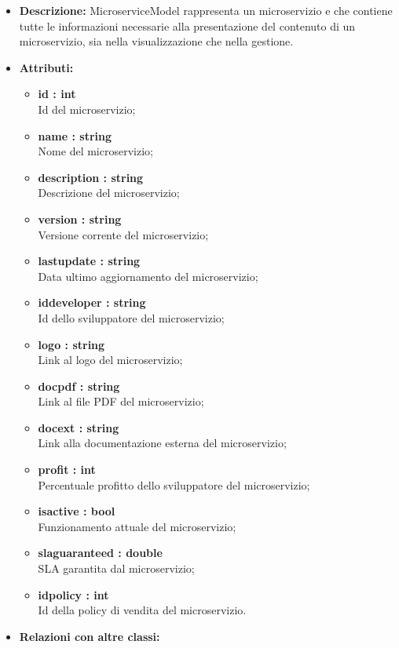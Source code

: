\begin{itemize}
	\item \textbf{Descrizione:} MicroserviceModel rappresenta un microservizio e che contiene tutte le
informazioni necessarie alla presentazione del contenuto di un microservizio, sia nella visualizzazione che nella gestione.
	\item \textbf{Attributi:}
		\begin{itemize}
			\item \textbf{id : int}\\
			Id del microservizio;
			\item \textbf{name : string}\\
			Nome del microservizio;
			\item \textbf{description : string}\\
			Descrizione del microservizio;
			\item \textbf{version : string}\\
			Versione corrente del microservizio;
			\item \textbf{lastupdate : string}\\
			Data ultimo aggiornamento del microservizio;
			\item \textbf{iddeveloper : string}\\
			Id dello sviluppatore del microservizio;
			\item \textbf{logo : string}\\
			Link al logo del microservizio;
			\item \textbf{docpdf : string}\\
			Link al file PDF del microservizio;
			\item \textbf{docext : string}\\
			Link alla documentazione esterna del microservizio;
			\item \textbf{profit : int}\\
			Percentuale profitto dello sviluppatore del microservizio;
			\item \textbf{isactive : bool}\\
			Funzionamento attuale del microservizio;
			\item \textbf{slaguaranteed : double}\\
			SLA garantita dal microservizio;
			\item \textbf{idpolicy : int}\\
			Id della policy di vendita del microservizio.
		\end{itemize}
	\item \textbf{Relazioni con altre classi:}

\end{itemize}
